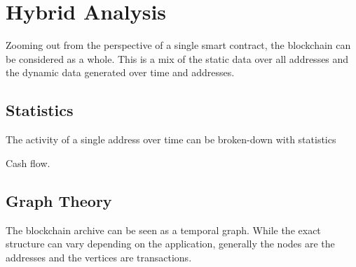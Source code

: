 \section{Hybrid Analysis} \label{sec:data-hybrid}

Zooming out from the perspective of a single smart contract, the blockchain can be considered as a whole.
This is a mix of the static data over all addresses and the dynamic data generated over time and addresses.

\subsection{Statistics} \label{sec:hybrid-stats}

The activity of a single address over time can be broken-down with statistics

Cash flow.

\subsection{Graph Theory} \label{sec:hybrid-graph}

The blockchain archive can be seen as a temporal graph.
While the exact structure can vary depending on the application, generally the nodes are the addresses and the vertices are transactions.
